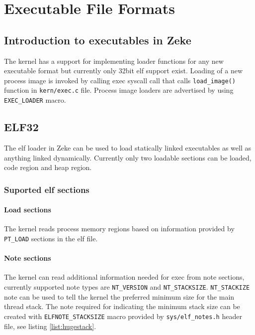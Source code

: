 \chapter{Executable File Formats}

\section{Introduction to executables in Zeke}

The kernel has a support for implementing loader functions for any new
executable format but currently only 32bit \acf{elf} support exist.
Loading of a new process image is invoked by calling exec syscall call that
calls \verb+load_image()+ function in \verb+kern/exec.c+ file.
Process image loaders are advertised by using \verb+EXEC_LOADER+ macro.

\section{ELF32}

The \acs{elf} loader in Zeke can be used to load statically linked executables
as well as anything linked dynamically. Currently only two loadable sections can
be loaded, code region and heap region.

\subsection{Suported \acs{elf} sections}
\subsubsection{Load sections}

The kernel reads process memory regions based on information provided by
\verb+PT_LOAD+ sections in the \acs{elf} file.

\subsubsection{Note sections}

The kernel can read additional information needed for exec from note sections,
currently supported note types are \verb+NT_VERSION+ and \verb+NT_STACKSIZE+.
\verb+NT_STACKIZE+ note can be used to tell the kernel the preferred minimum
size for the main thread stack. The note required for indicating the minimum
stack size can be created with \verb+ELFNOTE_STACKSIZE+ macro provided by
\verb+sys/elf_notes.h+ header file, see listing \ref{list:hugestack}.


